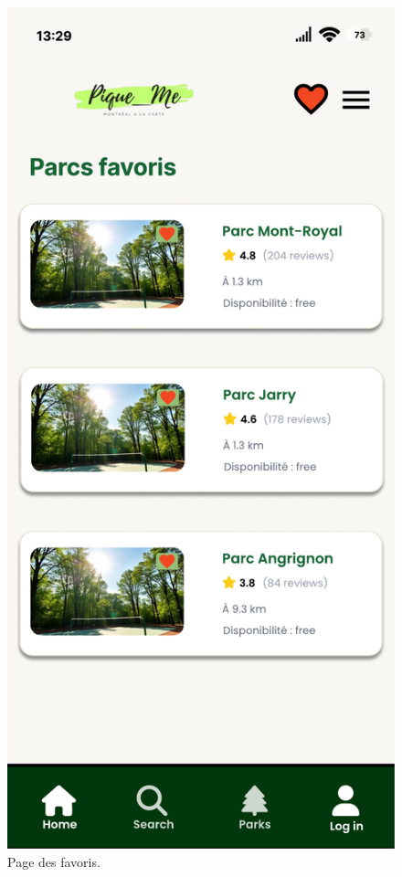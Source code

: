 \documentclass[12pt,a4paper]{article}
\begin{document}
\begin{figure}[h!]
  \centering
  \includegraphics[width=0.9\linewidth]{attachments/PageParcsFavori.pdf}
  \caption{Page des favoris.}
\end{figure}
\end{document}
